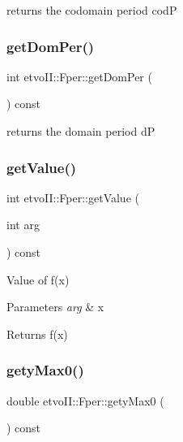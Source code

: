 returns the codomain period codP \mbox{\label{classetvo_i_i_1_1_fper_af82745f0d1e1a2ba21dc12e2015e8106}} 
\subsubsection{\texorpdfstring{get\+Dom\+Per()}{getDomPer()}}
{\footnotesize\ttfamily int etvo\+I\+I\+::\+Fper\+::get\+Dom\+Per (\begin{DoxyParamCaption}{ }\end{DoxyParamCaption}) const}

returns the domain period dP \mbox{\label{classetvo_i_i_1_1_fper_a4a9e4e5907c291501be4919fd15d60c6}} 
\subsubsection{\texorpdfstring{get\+Value()}{getValue()}}
{\footnotesize\ttfamily int etvo\+I\+I\+::\+Fper\+::get\+Value (\begin{DoxyParamCaption}\item[{int}]{arg }\end{DoxyParamCaption}) const}



Value of f(x) 


\begin{DoxyParams}{Parameters}
{\em arg} & x \\
\hline
\end{DoxyParams}
\begin{DoxyReturn}{Returns}
f(x) 
\end{DoxyReturn}
\mbox{\label{classetvo_i_i_1_1_fper_a02538c38c894b6af355209a45749e775}} 
\subsubsection{\texorpdfstring{gety\+Max0()}{getyMax0()}}
{\footnotesize\ttfamily double etvo\+I\+I\+::\+Fper\+::gety\+Max0 (\begin{DoxyParamCaption}{ }\end{DoxyParamCaption}) const}

